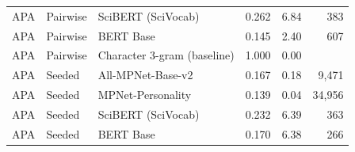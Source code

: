 \begin{table}[ht]
\begin{tabular}{lllrrr}
APA & Pairwise & SciBERT (SciVocab) & 0.262 & 6.84 & 383 \\
APA & Pairwise & BERT Base & 0.145 & 2.40 & 607 \\
APA & Pairwise & Character 3-gram (baseline) & 1.000 & 0.00 &  \\
APA & Seeded & All-MPNet-Base-v2 & 0.167 & 0.18 & 9,471 \\
APA & Seeded & MPNet-Personality & 0.139 & 0.04 & 34,956 \\
APA & Seeded & SciBERT (SciVocab) & 0.232 & 6.39 & 363 \\
APA & Seeded & BERT Base & 0.170 & 6.38 & 266 \\
\bottomrule
\end{tabular}
\end{table}
